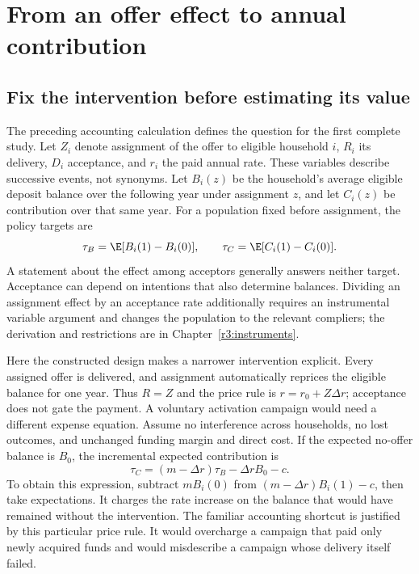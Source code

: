\chapter{From an offer effect to annual contribution}
\label{rewrite:deposit}


\section{Fix the intervention before estimating its value}
The preceding accounting calculation defines the question for the first
complete study. Let $Z_i$ denote assignment of the offer to eligible household
$i$, $R_i$ its delivery, $D_i$ acceptance, and $r_i$ the paid annual rate.
These variables describe successive events, not synonyms. Let $B_i(z)$ be
the household's average eligible deposit balance over the following year under
assignment $z$, and let $C_i(z)$ be contribution over that same year. For a
population fixed before assignment, the policy targets are
\[
 \tau_B=\E[B_i(1)-B_i(0)],\qquad
 \tau_C=\E[C_i(1)-C_i(0)].
\]
A statement about the effect among acceptors generally answers neither target.
Acceptance can depend on intentions that also determine balances. Dividing an
assignment effect by an acceptance rate additionally requires an instrumental
variable argument and changes the population to the relevant compliers; the
derivation and restrictions are in Chapter~\ref{r3:instruments}.

Here the constructed design makes a narrower intervention explicit. Every
assigned offer is delivered, and assignment automatically reprices the eligible
balance for one year. Thus $R=Z$ and the price rule is $r=r_0+Z\Delta r$;
acceptance does not gate the payment. A voluntary activation campaign would
need a different expense equation. Assume no interference across households,
no lost outcomes, and unchanged funding margin and direct cost. If the
expected no-offer balance is $B_0$, the incremental expected contribution is
\begin{equation}
 \tau_C=(m-\Delta r)\tau_B-\Delta r B_0-c.
 \label{rewrite:value-map}
\end{equation}
To obtain this expression, subtract $mB_i(0)$ from
$(m-\Delta r)B_i(1)-c$, then take expectations. It charges the rate
increase on the balance that would have remained without the intervention.
The familiar accounting shortcut is justified by this particular price rule.
It would overcharge a campaign that paid only newly acquired funds and would
misdescribe a campaign whose delivery itself failed.

